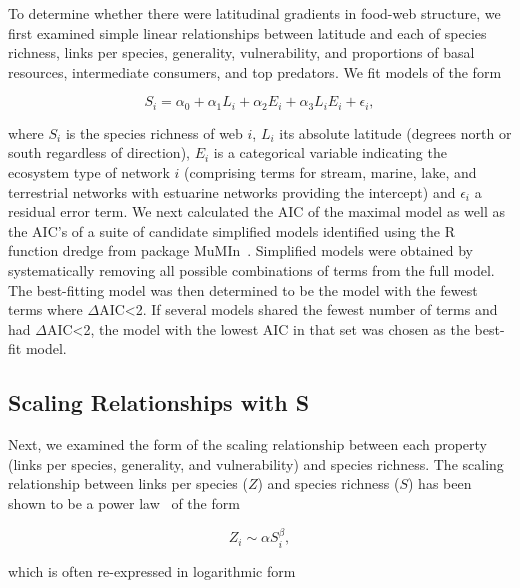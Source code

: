 \documentclass[12pt]{article}
\begin{document}
\begin{spacing}{1.0}
    To determine whether there were latitudinal gradients in food-web structure,
    we first examined simple linear relationships between latitude and each of 
    species richness, links per species, generality, vulnerability, and proportions
    of basal resources, intermediate consumers, and top predators. We fit models of the form

    \begin{equation}
    \label{Latfull}
    S_{i} = \alpha_{0} + \alpha_{1} L_{i} + \alpha_{2} E_{i} + \alpha_{3} L_{i} E_{i} + \epsilon_{i} ,
    \end{equation}

    \noindent where $S_{i}$ is the species richness of web $i$, $L_{i}$ its absolute
    latitude (degrees north or south  regardless of direction), $E_{i}$ is a categorical
    variable indicating the ecosystem type of network $i$ (comprising terms for stream, 
    marine, lake, and terrestrial networks with estuarine
    networks providing the intercept) and $\epsilon_{i}$ a residual error term. 
    We next calculated the AIC
    of the maximal model as well as the AIC's of a suite of candidate simplified models identified
    using the R~\citep{R} function dredge from package MuMIn~\citep{MuMIn}. 
    Simplified models were obtained by
    systematically removing all possible combinations of terms from the full model.
    The best-fitting model was then determined to be the model with the fewest terms 
    where $\Delta$AIC\textless2. If several models shared the fewest number of terms 
    and had $\Delta$AIC\textless2, the model with the lowest AIC in that set was chosen as the best-fit
    model.


  \subsection*{Scaling Relationships with S}

    Next, we examined the form of the scaling relationship between each 
    property (links per species, generality, and vulnerability) and 
    species richness. The scaling relationship between links per species ($Z$) and 
    species richness ($S$) has been shown to be a power law~\citep{Riede2010} of the form 

    \begin{equation}
    \label{Power}
    Z_{i} \sim \alpha S_{i}^{\beta}  ,
    \end{equation}

    \noindent which is often re-expressed in logarithmic form 


\end{spacing}
\end{document}
